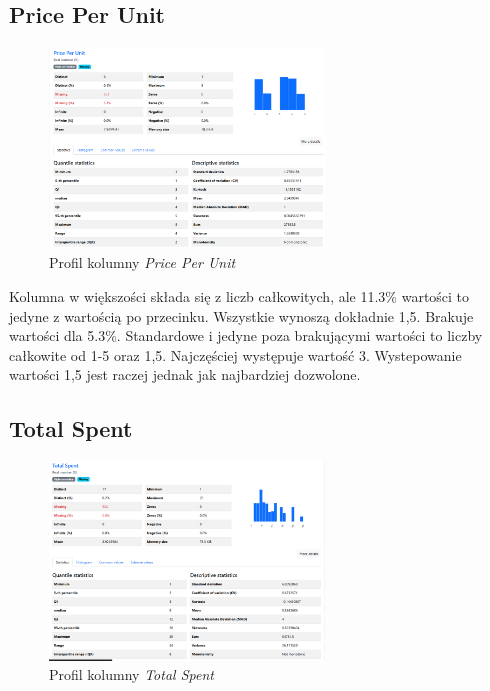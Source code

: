 \documentclass[a4paper,12pt]{article}
\begin{document}
\subsection{Price Per Unit}

\begin{figure}[H]
  \centering
  \includegraphics[width=0.65\textwidth]{images/py_4.png}
  \caption{Profil kolumny \textit{Price Per Unit}}
\end{figure}

Kolumna w większości składa się z liczb całkowitych, ale 11.3\% wartości to jedyne z wartością po przecinku. Wszystkie wynoszą dokładnie 1,5. Brakuje wartości dla 5.3\%. Standardowe i jedyne poza brakującymi wartości to liczby całkowite od 1-5 oraz 1,5. Najczęściej występuje wartość 3. Wystepowanie wartości 1,5 jest raczej jednak jak najbardziej dozwolone.

\subsection{Total Spent}

\begin{figure}[H]
  \centering
  \includegraphics[width=0.65\textwidth]{images/py_5.png}
  \caption{Profil kolumny \textit{Total Spent}}
\end{figure}
\end{document}
